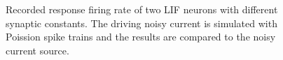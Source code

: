 \documentclass[runningheads,a4paper]{llncs}
\begin{document}
	\begin{figure}[bt!]
		\centering
		\caption{
			Recorded response firing rate of two LIF neurons with different synaptic constants.
			The driving noisy current is simulated with Poission spike trains and the results are compared to the noisy current source.}
		\label{fig:lif_pois}	
	\end{figure}
	
\end{document}
